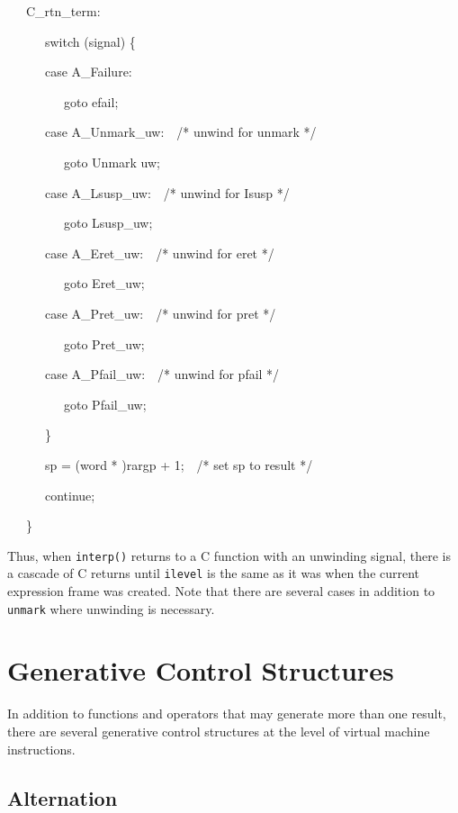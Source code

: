 {\ttfamily\mdseries
\ \ \ C\_rtn\_term:}

{\ttfamily\mdseries
\ \ \ \ \ \ switch (signal) \{}

{\ttfamily\mdseries
\ \ \ \ \ \ case A\_Failure:}

{\ttfamily\mdseries
\ \ \ \ \ \ \ \ \ goto efail;}

{\ttfamily\mdseries
\ \ \ \ \ \ case A\_Unmark\_uw:\ \ /* unwind for unmark */}

{\ttfamily\mdseries
\ \ \ \ \ \ \ \ \ goto Unmark uw;}

{\ttfamily\mdseries
\ \ \ \ \ \ case A\_Lsusp\_uw:\ \ /* unwind for Isusp */}

{\ttfamily\mdseries
\ \ \ \ \ \ \ \ \ goto Lsusp\_uw;}

{\ttfamily\mdseries
\ \ \ \ \ \ case A\_Eret\_uw:\ \ /* unwind for eret */}

{\ttfamily\mdseries
\ \ \ \ \ \ \ \ \ goto Eret\_uw;}

{\ttfamily\mdseries
\ \ \ \ \ \ case A\_Pret\_uw:\ \ /* unwind for pret */}

{\ttfamily\mdseries
\ \ \ \ \ \ \ \ \ goto Pret\_uw;}

{\ttfamily\mdseries
\ \ \ \ \ \ case A\_Pfail\_uw:\ \ /* unwind for pfail */}

{\ttfamily\mdseries
\ \ \ \ \ \ \ \ \ goto Pfail\_uw;}

{\ttfamily\mdseries
\ \ \ \ \ \ \}}

{\ttfamily\mdseries
\ \ \ \ \ \ sp = (word * )rargp + 1;\ \ /* set sp to result */}

{\ttfamily\mdseries
\ \ \ \ \ \ continue;}

{\ttfamily\mdseries
\ \ \ \}}


Thus, when \texttt{interp()} returns to a C function with an unwinding
signal, there is a cascade of C returns until \texttt{ilevel} is the
same as it was when the current expression frame was created. Note
that there are several cases in addition to \texttt{unmark} where
unwinding is necessary.

\section{Generative Control Structures}

In addition to functions and operators that may generate more than one
result, there are several generative control structures at the level
of virtual machine instructions.

\subsection{Alternation}

